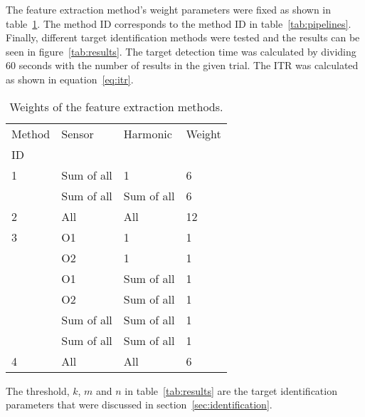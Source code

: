 The \gls{feature extraction} method's weight parameters were fixed as shown in table~\ref{tab:weights}. The method ID corresponds to the method ID in table~\ref{tab:pipelines}. Finally, different \gls{target} identification methods were tested and the results can be seen in figure~\ref{tab:results}. The \gls{target} detection time was calculated by dividing 60 seconds with the number of results in the given trial. The \gls{ITR} was calculated as shown in equation~\ref{eq:itr}.

	\begin{table}[h]
		\centering
		\begin{tabular}{|l|l|l|l|}\hline
Method	& Sensor 	& Harmonic		& Weight\\
ID		& 		 	&  				& 		\\\hline
1		& Sum of all& 1				& 6		\\\cline{2-4}
		& Sum of all& Sum of all	& 6		\\\hline
2		& All	 	& All			& 12	\\\hline
3		& O1	 	& 1				& 1		\\\cline{2-4}
		& O2	 	& 1				& 1		\\\cline{2-4}
		& O1	 	& Sum of all	& 1		\\\cline{2-4}
		& O2	 	& Sum of all	& 1		\\\cline{2-4}
		& Sum of all& Sum of all	& 1		\\\cline{2-4}
		& Sum of all& Sum of all	& 1		\\\hline
4		& All		& All			& 6		\\\hline
		\end{tabular}
		\caption{Weights of the feature extraction methods.}
		\label{tab:weights}
	\end{table}

The threshold, $k$, $m$ and $n$ in table~\ref{tab:results} are the \gls{target} identification parameters that were discussed in section~\ref{sec:identification}.

